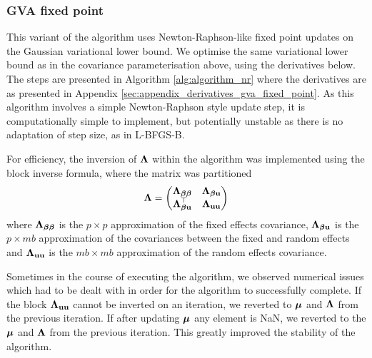 \subsubsection{GVA fixed point} 	%
This variant of the algorithm uses Newton-Raphson-like fixed point updates on the Gaussian variational lower
bound. We optimise the same variational lower bound as in the covariance parameterisation above, using the
derivatives below. The steps are presented in Algorithm \ref{alg:algorithm_nr} where   the derivatives are as
presented in Appendix \ref{sec:appendix_derivatives_gva_fixed_point}. As this algorithm involves a simple
Newton-Raphson style update step, it is computationally simple to implement, but potentially unstable as there
is no adaptation of step size, as in L-BFGS-B.

For efficiency, the inversion of ${\boldsymbol \Lambda}$ within the algorithm was implemented using the block inverse 
formula, where	the matrix was partitioned
\[
	{\boldsymbol \Lambda} =
	\begin{pmatrix}
		{\boldsymbol\Lambda}_{{\boldsymbol \beta} {\boldsymbol \beta}} & {\boldsymbol \Lambda}_{{\boldsymbol \beta} {\bf u}} \\
		{\boldsymbol \Lambda}_{{\boldsymbol \beta} {\bf u}}^\top & {\boldsymbol \Lambda}_{{\bf u} {\bf u}}
	\end{pmatrix}
\]
where ${\boldsymbol \Lambda}_{{\boldsymbol \beta} {\boldsymbol \beta}}$ is the $p \times p$ approximation of the fixed effects covariance, ${\boldsymbol \Lambda}_{{\boldsymbol \beta} {\bf u}}$ is the $p \times mb$
approximation of the covariances between the fixed and random effects and ${\boldsymbol \Lambda}_{{\bf u} {\bf u}}$ is the $mb \times mb$
approximation of the random effects covariance.

Sometimes in the course of  executing the algorithm, we observed numerical issues which had to be dealt
with in order for the algorithm to successfully complete. If the block ${\boldsymbol \Lambda}_{{\bf u} {\bf u}}$ cannot be inverted on an
iteration, we reverted to ${\boldsymbol \mu}$ and ${\boldsymbol \Lambda}$ from the previous iteration. If after updating ${\boldsymbol \mu}$
any element is NaN, we reverted to the ${\boldsymbol \mu}$ and ${\boldsymbol \Lambda}$ from the previous iteration. This greatly
improved the stability of the algorithm.

